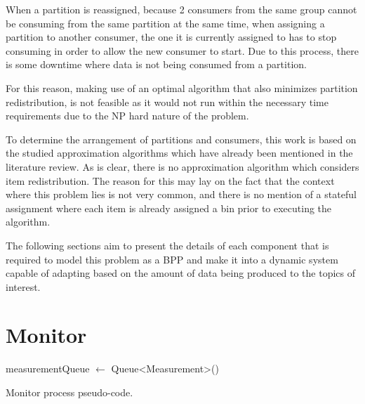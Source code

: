 When a partition is reassigned, because 2 consumers from the same group cannot
be consuming from the same partition at the same time, when assigning a
partition to another consumer, the one it is currently assigned to has to stop
consuming in order to allow the new consumer to start. Due to this process,
there is some downtime where data is not being consumed from a partition.

For this reason, making use of an optimal algorithm that also minimizes
partition redistribution, is not feasible as it would not run within the
necessary time requirements due to the NP hard nature of the problem. 

To determine the arrangement of partitions and consumers, this work is based on
the studied approximation algorithms which have already been mentioned in the
literature review. As is clear, there is no approximation algorithm which
considers item redistribution. The reason for this may lay on the fact that the
context where this problem lies is not very common, and there is no mention of a
stateful assignment where each item is already assigned a bin prior to executing
the algorithm.

The following sections aim to present the details of each component that is
required to model this problem as a BPP and make it into a dynamic system
capable of adapting based on the amount of data being produced to the topics of
interest.

\section{Monitor} \label{component:Monitor}

\IncMargin{1em} \begin{algorithm}[h]
      \BlankLine

measurementQueue $\gets$ Queue<Measurement>()\;  \caption{Monitor process pseudo-code.}
\label{algo:monitor} \end{algorithm}\DecMargin{1em}

